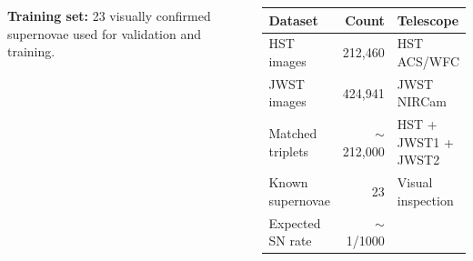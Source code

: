 \documentclass[25pt, a0paper, portrait]{tikzposter}
\begin{document}
\begin{columns}
{    \vspace{4mm}
    \textbf{Training set:}
    23 visually confirmed supernovae used for validation and training.

    \vspace{4mm}
    \begin{center}
    \begin{tabular}{lrl}
        \toprule
        \textbf{Dataset} & \textbf{Count} & \textbf{Telescope} \\
        \midrule
        HST images          & 212,460 & HST ACS/WFC \\
        JWST images         & 424,941 & JWST NIRCam \\
        Matched triplets    & $\sim$212,000 & HST + JWST1 + JWST2 \\
        Known supernovae    & 23 & Visual inspection \\
        Expected SN rate    & $\sim$1/1000 & \\
        \bottomrule
    \end{tabular}
    \end{center}
}

\end{columns}

\end{document}
